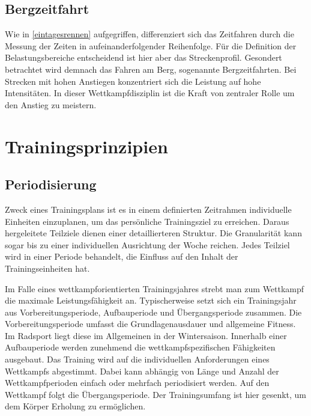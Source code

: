 \subsection{Bergzeitfahrt}
Wie in \ref{eintagesrennen} aufgegriffen, differenziert sich das Zeitfahren durch die Messung der Zeiten in aufeinanderfolgender Reihenfolge. Für die Definition der Belastungsbereiche entscheidend ist hier aber das Streckenprofil. Gesondert betrachtet wird demnach das Fahren am Berg, sogenannte Bergzeitfahrten. Bei Strecken mit hohen Anstiegen konzentriert sich die Leistung auf hohe Intensitäten. In dieser Wettkampfdisziplin ist die Kraft von zentraler Rolle um den Anstieg zu meistern.

\section{Trainingsprinzipien}
\subsection{Periodisierung}
Zweck eines Trainingsplans ist es in einem definierten Zeitrahmen individuelle Einheiten einzuplanen, um das persönliche Trainingsziel zu erreichen. Daraus hergeleitete Teilziele dienen einer detaillierteren Struktur. Die Granularität kann sogar bis zu einer individuellen Ausrichtung der Woche reichen. Jedes Teilziel wird in einer Periode behandelt, die Einfluss auf den Inhalt der Trainingseinheiten hat.\cite{periodization} \par
Im Falle eines wettkampforientierten Trainingsjahres strebt man zum Wettkampf die maximale Leistungsfähigkeit an. Typischerweise setzt sich ein Trainingsjahr aus Vorbereitungsperiode, Aufbauperiode und Übergangsperiode zusammen. \cite[279]{Trainingswissenschaft} Die Vorbereitungsperiode umfasst die Grundlagenausdauer und allgemeine Fitness. Im Radsport liegt diese im Allgemeinen in der Wintersaison. Innerhalb einer Aufbauperiode werden zunehmend die wettkampfspezifischen Fähigkeiten ausgebaut. Das Training wird auf die individuellen Anforderungen eines Wettkampfs abgestimmt. Dabei kann abhängig von Länge und Anzahl der Wettkampfperioden einfach oder mehrfach periodisiert werden. Auf den Wettkampf folgt die Übergangsperiode. Der Trainingsumfang ist hier gesenkt, um dem Körper Erholung zu ermöglichen.
